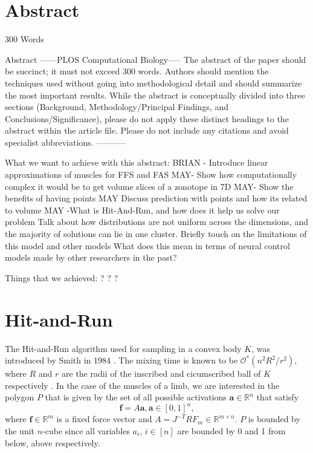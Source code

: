 \documentclass[a4paper,11pt]{article}
\theoremstyle{nonumberplain}
\begin{document}
\section{Abstract}
300 Words

Abstract
------PLOS Computational Biology-----
The abstract of the paper should be succinct; it must not exceed 300 words. Authors should mention the techniques used without going into methodological detail and should summarize the most important results. While the abstract is conceptually divided into three sections (Background, Methodology/Principal Findings, and Conclusions/Significance), please do not apply these distinct headings to the abstract within the article file. Please do not include any citations and avoid specialist abbreviations.
-----------


What we want to achieve with this abstract:
BRIAN - Introduce linear approximations of muscles for FFS and FAS
MAY- Show how computationally complex it would be to get volume slices of a zonotope in 7D
MAY- Show the benefits of having points
MAY Discuss prediction with points and how its related to volume
MAY -What is Hit-And-Run, and how does it help us solve our problem
Talk about how distributions are not uniform across the dimensions, and the majority of solutions can lie in one cluster.
Briefly touch on the limitations of this model and other models
What does this mean in terms of neural control models made by other researchers in the past?

Things that we achieved:
?
?
?








\section{Hit-and-Run}
The Hit-and-Run algorithm used for sampling in a convex body $K$, was introduced by Smith in 1984 \cite{Smith}. The mixing time is known to be $\mathcal{O}^*(n^2R^2/r^2)$, where $R$ and $r$ are the radii of the inscribed and cicumscribed ball of $K$ respectively \cite{Dyer, Lovasz}.
In the case of the muscles of a limb, we are interested in the polygon $P$ that is given by the set of all possible activations $\textbf{a} \in \mathbb{R}^n$ that satisfy
\[\textbf{f} = A\textbf{a}, \textbf{a} \in [0,1]^n,\]
where $\textbf{f} \in \mathbb{R}^m$ is a fixed force vector and $A = J^{-T}RF_m \in \mathbb{R}^{m \times n}$. $P$ is bounded by the unit $n$-cube since all variables $a_i$, $i \in [n]$ are bounded by 0 and 1 from below, above respectively.
\end{document}
